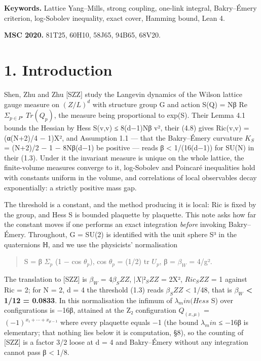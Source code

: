 \documentclass[11pt,a4paper]{article}
\theoremstyle{named}
\begin{document}
\textbf{Keywords.} Lattice Yang–Mills, strong coupling, one-link integral, Bakry–Émery criterion, log-Sobolev inequality, exact cover, Hamming bound, Lean 4.

\textbf{MSC 2020.} 81T25, 60H10, 58J65, 94B65, 68V20.

\section*{1. Introduction}
Shen, Zhu and Zhu [SZZ] study the Langevin dynamics of the Wilson lattice gauge measure on $(Z/L)^d$ with structure group G and action S(Q) = Nβ Re $Σ_{p ∈ P⁺}$ $Tr(Q_p)$, the measure being proportional to exp(S). Their Lemma 4.1 bounds the Hessian by \textbar{}Hess S(v,v)\textbar{} ≤ 8(d−1)N\textbar{}β\textbar{} \textbar{}v\textbar{}², their (4.8) gives Ric(v,v) = (α(N+2)/4 − 1)\textbar{}X\textbar{}², and Assumption 1.1 — that the Bakry–Émery curvature $K_S$ = (N+2)/2 − 1 − 8N\textbar{}β\textbar{}(d−1) be positive — reads \textbar{}β\textbar{} \textless{} 1/(16(d−1)) for SU(N) in their (1.3). Under it the invariant measure is unique on the whole lattice, the finite-volume measures converge to it, log-Sobolev and Poincaré inequalities hold with constants uniform in the volume, and correlations of local observables decay exponentially: a strictly positive mass gap.

The threshold is a constant, and the method producing it is local: Ric is fixed by the group, and Hess S is bounded plaquette by plaquette. This note asks how far the constant moves if one performs an exact integration \textit{before} invoking Bakry–Émery. Throughout, G = SU(2) is identified with the unit sphere S³ in the quaternions ℍ, and we use the physicists' normalisation

\begin{quote}
S = β $Σ_p$ (1 − cos $θ_p$),  cos $θ_p$ = (1/2) tr $U_p$,  β = $β_W$ = 4/g².
\end{quote}
The translation to [SZZ] is $β_W$ = $4β_SZZ$, $|X|²_SZZ$ = 2\textbar{}X\textbar{}², $Ric_SZZ$ = 1 against Ric = 2; for N = 2, d = 4 the threshold (1.3) reads $β_SZZ$ \textless{} 1/48, that is \textbf{$β_W$ \textless{} 1/12 = 0.0833}. In this normalisation the infimum of $λ_min(Hess$ S) over configurations is −16β, attained at the Z₂ configuration $Q_{(x,μ)}$ = $(−1)^{x₁+⋯+x_{μ−1}}$ where every plaquette equals −1 (the bound $λ_min$ ≤ −16β is elementary; that nothing lies below it is computation, §8), so the counting of [SZZ] is a factor 3/2 loose at d = 4 and Bakry–Émery without any integration cannot pass β \textless{} 1/8.
\end{document}
